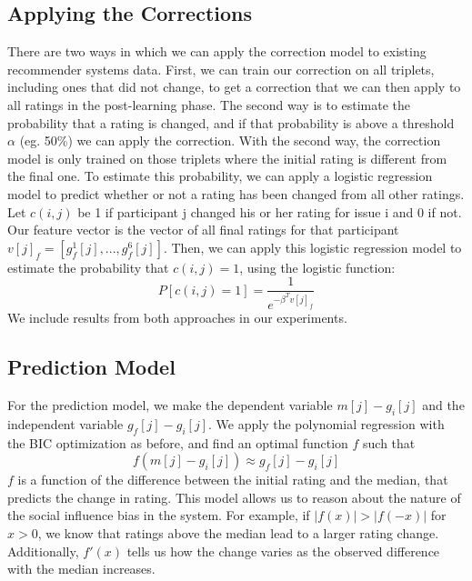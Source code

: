 \subsection{Applying the Corrections}
There are two ways in which we can apply the correction model to existing recommender systems data.
First, we can train our correction on all triplets, including ones that did not change, to get a correction that we can then apply to all ratings in the post-learning phase.
The second way is to estimate the probability that a rating is changed, and if that probability is above a threshold $\alpha$ (eg. 50\%) we can apply the correction.
With the second way, the correction model is only trained on those triplets where the initial rating is different from the final one.
To estimate this probability, we can apply a logistic regression model to predict whether or not a rating has been changed from all other ratings.
Let $c(i,j)$ be 1 if participant j changed his or her rating for issue i and 0 if not. 
Our feature vector is the vector of all final ratings for that participant $v[j]_f = [g_f^1[j],...,g_f^6[j]]$.
Then, we can apply this logistic regression model to estimate the probability that $c(i,j) = 1$, using the logistic function:
 \begin{equation}
 P[c(i,j) = 1] = \frac{1}{e^{-\beta^Tv[j]_f}}
 \end{equation}
We include results from both approaches in our experiments.

\subsection{Prediction Model}
For the prediction model, we make the dependent variable $m[j] - g_i[j]$ and the independent variable $g_f[j] - g_i[j]$.
We apply the polynomial regression with the BIC optimization as before, and find an optimal function $f$ such that \begin{equation}f(m[j] - g_i[j]) \approx g_f[j] - g_i[j]\end{equation}
$f$ is a function of the difference between the initial rating and the median, that predicts the change in rating.
This model allows us to reason about the nature of the social influence bias in the system.
For example, if $|f(x)| > |f(-x)|$ for $x > 0$, we know that ratings above the median lead to a larger rating change.
Additionally, $f'(x)$ tells us how the change varies as the observed difference with the median increases. 
